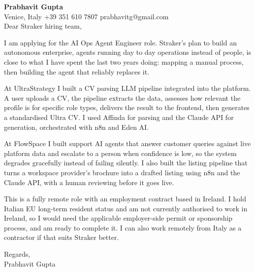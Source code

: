 \documentclass[a4paper,10.5pt]{article}
\begin{document}
\textbf{Prabhavit Gupta}\\
Venice, Italy \textbar{} +39 351 610 7807 \textbar{} prabhavitg@gmail.com\\[10pt]
Dear Straker hiring team,

I am applying for the AI Ops Agent Engineer role. Straker's plan to build an autonomous enterprise, agents running day to day operations instead of people, is close to what I have spent the last two years doing: mapping a manual process, then building the agent that reliably replaces it.

At UltraStrategy I built a CV parsing LLM pipeline integrated into the platform. A user uploads a CV, the pipeline extracts the data, assesses how relevant the profile is for specific role types, delivers the result to the frontend, then generates a standardised Ultra CV. I used Affinda for parsing and the Claude API for generation, orchestrated with n8n and Eden AI.

At FlowSpace I built support AI agents that answer customer queries against live platform data and escalate to a person when confidence is low, so the system degrades gracefully instead of failing silently. I also built the listing pipeline that turns a workspace provider's brochure into a drafted listing using n8n and the Claude API, with a human reviewing before it goes live.

This is a fully remote role with an employment contract based in Ireland. I hold Italian EU long-term resident status and am not currently authorised to work in Ireland, so I would need the applicable employer-side permit or sponsorship process, and am ready to complete it. I can also work remotely from Italy as a contractor if that suits Straker better.

Regards,\\
Prabhavit Gupta
\end{document}
